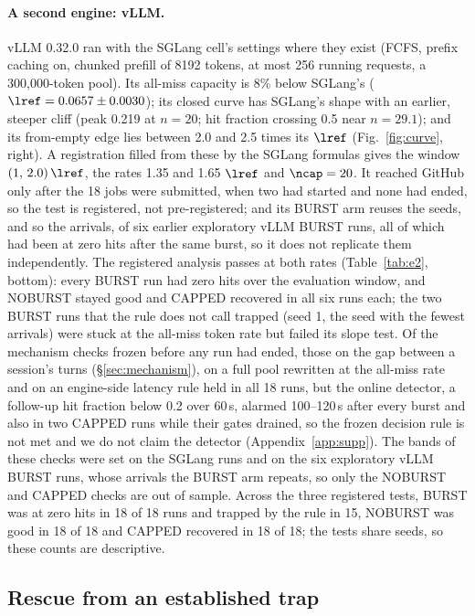 \paragraph{A second engine: vLLM.}\label{sec:vllm}
vLLM 0.32.0 ran with the SGLang cell's settings where they exist (FCFS, prefix caching on, chunked prefill of 8192 tokens, at most 256 running requests, a 300,000-token pool). Its all-miss capacity is 8\% below SGLang's ($\lref=0.0657\pm0.0030$\sps); its closed curve has SGLang's shape with an earlier, steeper cliff (peak 0.219\sps{} at $n=20$; hit fraction crossing 0.5 near $n=29.1$); and its from-empty edge lies between 2.0 and 2.5 times its $\lref$ (Fig.~\ref{fig:curve}, right). A registration filled from these by the SGLang formulas gives the window $(1,\,2.0)\,\lref$, the rates 1.35 and 1.65 $\lref$ and $\ncap=20$. It reached GitHub only after the 18 jobs were submitted, when two had started and none had ended, so the test is registered, not pre-registered; and its BURST arm reuses the seeds, and so the arrivals, of six earlier exploratory vLLM BURST runs, all of which had been at zero hits after the same burst, so it does not replicate them independently. The registered analysis passes at both rates (Table~\ref{tab:e2}, bottom): every BURST run had zero hits over the evaluation window, and NOBURST stayed good and CAPPED recovered in all six runs each; the two BURST runs that the rule does not call trapped (seed 1, the seed with the fewest arrivals) were stuck at the all-miss token rate but failed its slope test. Of the mechanism checks frozen before any run had ended, those on the gap between a session's turns (\S\ref{sec:mechanism}), on a full pool rewritten at the all-miss rate and on an engine-side latency rule held in all 18 runs, but the online detector, a follow-up hit fraction below 0.2 over 60\,s, alarmed 100--120\,s after every burst and also in two CAPPED runs while their gates drained, so the frozen decision rule is not met and we do not claim the detector (Appendix~\ref{app:supp}). The bands of these checks were set on the SGLang runs and on the six exploratory vLLM BURST runs, whose arrivals the BURST arm repeats, so only the NOBURST and CAPPED checks are out of sample. Across the three registered tests, BURST was at zero hits in 18 of 18 runs and trapped by the rule in 15, NOBURST was good in 18 of 18 and CAPPED recovered in 18 of 18; the tests share seeds, so these counts are descriptive.

\subsection{Rescue from an established trap}\label{sec:rescue}

